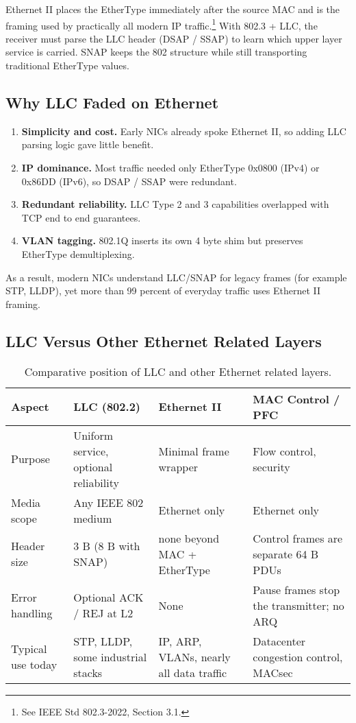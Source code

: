 Ethernet II places the EtherType immediately after the source MAC and is the framing used by practically all modern IP traffic.\footnote{See IEEE Std 802.3-2022, Section 3.1.}  
With 802.3 + LLC, the receiver must parse the LLC header (DSAP / SSAP) to learn which upper layer service is carried.  
SNAP keeps the 802 structure while still transporting traditional EtherType values.

\subsection{Why LLC Faded on Ethernet}

\begin{enumerate}
  \item \textbf{Simplicity and cost.} Early NICs already spoke Ethernet II, so adding LLC parsing logic gave little benefit.
  \item \textbf{IP dominance.} Most traffic needed only EtherType 0x0800 (IPv4) or 0x86DD (IPv6), so DSAP / SSAP were redundant.
  \item \textbf{Redundant reliability.} LLC Type 2 and 3 capabilities overlapped with TCP end to end guarantees.
  \item \textbf{VLAN tagging.} 802.1Q inserts its own 4 byte shim but preserves EtherType demultiplexing.
\end{enumerate}

As a result, modern NICs understand LLC/SNAP for legacy frames (for example STP, LLDP), yet more than 99 percent of everyday traffic uses Ethernet II framing.

\subsection{LLC Versus Other Ethernet Related Layers}

\begin{table}[h]
\centering
\footnotesize
\begin{tabular}{@{}p{3cm}p{3cm}p{3cm}p{3cm}@{}}
\toprule
\textbf{Aspect} & \textbf{LLC (802.2)} & \textbf{Ethernet II} & \textbf{MAC Control / PFC} \\
\midrule
Purpose & Uniform service, optional reliability & Minimal frame wrapper & Flow control, security \\
Media scope & Any IEEE 802 medium & Ethernet only & Ethernet only \\
Header size & 3 B (8 B with SNAP) & none beyond MAC + EtherType & Control frames are separate 64 B PDUs \\
Error handling & Optional ACK / REJ at L2 & None & Pause frames stop the transmitter; no ARQ \\
Typical use today & STP, LLDP, some industrial stacks & IP, ARP, VLANs, nearly all data traffic & Datacenter congestion control, MACsec \\
\bottomrule
\end{tabular}
\caption{Comparative position of LLC and other Ethernet related layers.}
\end{table}

